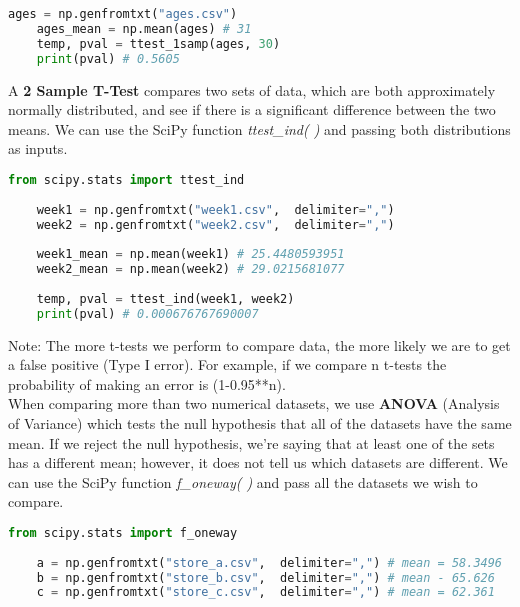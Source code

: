 \documentclass[11pt, a4paper]{article}
\begin{document}
\begin{spacing}{1.1}
\begin{lstlisting}[language=Python]
	ages = np.genfromtxt("ages.csv")
	ages_mean = np.mean(ages) # 31
	temp, pval = ttest_1samp(ages, 30)
	print(pval) # 0.5605 \end{lstlisting}\vspace*{1mm}
	A \textbf{2 Sample T-Test} compares two sets of data, which are both approximately normally distributed, and see if there is a significant difference between the two means. We can use the SciPy function \textit{ttest\_ind( )} and passing both distributions as inputs.
	\begin{lstlisting}[language=Python]
	from scipy.stats import ttest_ind
	
	week1 = np.genfromtxt("week1.csv",  delimiter=",")
	week2 = np.genfromtxt("week2.csv",  delimiter=",")
	
	week1_mean = np.mean(week1) # 25.4480593951
	week2_mean = np.mean(week2) # 29.0215681077
	
	temp, pval = ttest_ind(week1, week2)
	print(pval) # 0.000676767690007 \end{lstlisting}\vspace*{1mm}
	Note: The more t-tests we perform to compare data, the more likely we are to get a false positive (Type I error). For example, if we compare n t-tests the probability of making an error is (1-0.95**n). \vspace*{2mm} \\
	When comparing more than two numerical datasets, we use \textbf{ANOVA} (Analysis of Variance) which tests the null hypothesis that all of the datasets have the same mean. If we reject the null hypothesis, we’re saying that at least one of the sets has a different mean; however, it does not tell us which datasets are different. We can use the SciPy function \textit{f\_oneway( )} and pass all the datasets we wish to compare.
	\begin{lstlisting}[language=Python]
	from scipy.stats import f_oneway
		
	a = np.genfromtxt("store_a.csv",  delimiter=",") # mean = 58.3496
	b = np.genfromtxt("store_b.csv",  delimiter=",") # mean - 65.626
	c = np.genfromtxt("store_c.csv",  delimiter=",") # mean = 62.361
	

\end{lstlisting}
\end{spacing}
\end{document}
